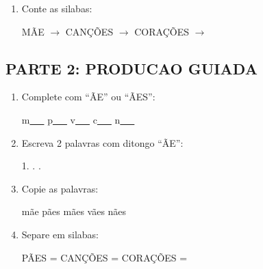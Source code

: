 \begin{exercicio}
\begin{enumerate}
  \item Conte as silabas:
  \begin{center}
  MÃE $\rightarrow$ \underline{\hspace{1cm}} \quad CANÇÕES $\rightarrow$ \underline{\hspace{1cm}} \quad CORAÇÕES $\rightarrow$ \underline{\hspace{1cm}}
  \end{center}
\end{enumerate}

\subsection*{PARTE 2: PRODUCAO GUIADA}

\begin{enumerate}[resume]
  \item Complete com ``ÃE'' ou ``ÃES'':
  \begin{center}
  m\underline{~~~} \quad p\underline{~~~} \quad v\underline{~~~} \quad c\underline{~~~} \quad n\underline{~~~}
  \end{center}

  \item Escreva 2 palavras com ditongo ``ÃE'':
  \begin{center}
  1. \underline{\hspace{3cm}} . \underline{\hspace{3cm}} . \underline{\hspace{3cm}}
  \end{center}

  \item Copie as palavras:
  \begin{center}
  mãe \quad pães \quad mães \quad vães \quad nães
  \end{center}

  \item Separe em silabas:
  \begin{center}
  PÃES = \underline{\hspace{1cm}} \underline{\hspace{1cm}} \quad CANÇÕES = \underline{\hspace{1cm}} \underline{\hspace{1cm}} \underline{\hspace{1cm}} \quad CORAÇÕES = \underline{\hspace{1cm}} \underline{\hspace{1cm}} \underline{\hspace{1cm}}
  \end{center}


\end{enumerate}
\end{exercicio}
